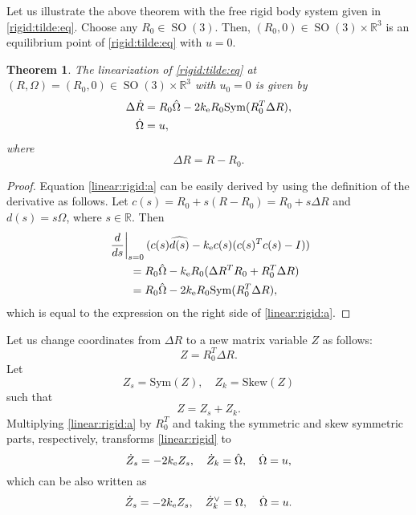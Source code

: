 \documentclass[letterpaper, 10 pt, conference]{ieeeconf}  %
\newtheorem{theorem}{Theorem}[section]
\newcommand{\Sym}{\mathrm{Sym}}
\newcommand{\Skew}{\mathrm{Skew}}
\newcommand{\SO}{\operatorname{SO}(3)}
\newcommand{\coV}{{k_{\rm e}}}
\begin{document}
Let us illustrate the above theorem with the free rigid body system given in \eqref{rigid:tilde:eq}. Choose any $R_0 \in \SO$. Then, $(R_0, 0) \in \SO \times \mathbb R^3$ is an equilibrium point of \eqref{rigid:tilde:eq} with $u = 0$. 
\begin{theorem}\label{theorem:rigid:linearization:point}
The linearization of  \eqref{rigid:tilde:eq} at $(R,\Omega) = (R_0, 0) \in \SO \times \mathbb R^3$ with $u_0 = 0$ is given by
\begin{subequations}\label{linear:rigid}
\begin{align}
\Delta \dot R &= R_0 \hat \Omega - 2\coV   R_0 \Sym (R_0^T\Delta R),\label{linear:rigid:a}\\
\dot \Omega &= u,\label{linear:rigid:b}
\end{align}
\end{subequations}
where 
\[
\Delta R = R -R_0.
\]
\end{theorem}
\begin{proof}
Equation \eqref{linear:rigid:a} can be easily derived by using the definition of the derivative as follows. Let $c(s) = R_0 + s (R-R_0) = R_0 + s\Delta R$ and $d(s) = s \Omega$, where $s\in \mathbb R$. Then
\begin{align*}
&\left . \frac{d}{ds} \right |_{s=0}  (c(s)\widehat {d(s)} - \coV c(s)(c(s)^Tc(s) - I))\\
&\qquad = R_0\hat\Omega - \coV  R_0 (\Delta R^T R_0 + R_0^T\Delta R)\\
&\qquad = R_0\hat\Omega - 2\coV R_0\Sym(R_0^T\Delta R),
\end{align*}
which is equal to the expression on the right side of \eqref{linear:rigid:a}.
\end{proof}

Let us change coordinates from $\Delta R$ to a new matrix variable $Z$ as follows:
\begin{equation}\label{def:ZR}
Z = R_0^T\Delta R.
\end{equation}
Let 
\begin{equation}\label{def:ZsZk}
Z_s = \Sym(Z), \quad Z_k = \Skew (Z)
\end{equation}
such that 
\begin{equation}\label{Z:Zs:Zk}
Z = Z_s + Z_k.
\end{equation}
  Multiplying \eqref{linear:rigid:a} by $R_0^T$ and taking the symmetric and skew symmetric parts, respectively,   transforms   \eqref{linear:rigid}  to 
\[
\dot Z_s = -2\coV Z_s,\quad
\dot Z_k = \hat \Omega, \quad \dot \Omega  = u,
\]
which can be also written as
\begin{equation}\label{rigid:Z:sys}
\dot Z_s = -2\coV Z_s,\quad
\dot Z_k^\vee =  \Omega, \quad \dot \Omega  = u.
\end{equation}
\end{document}
